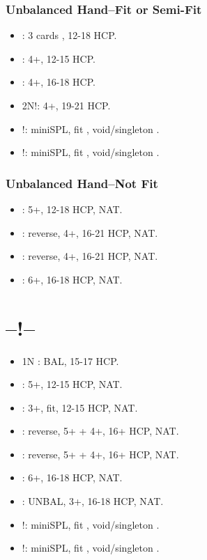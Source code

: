 \documentclass[12pt,twoside,a5paper]{report}%
\begin{document}
		\subsubsection*{Unbalanced Hand--Fit or Semi-Fit}
		\begin{itemize}
		\renewcommand{\labelitemi}{}	
			\item {} : 3 cards \he{}, 12-18 HCP.
			\item {} : 4+\sp{}, 12-15 HCP.
			\item {} : 4+\sp{}, 16-18 HCP.
			\item 2N!: 4+\sp{}, 19-21 HCP.
			\item {}!: miniSPL, fit \sp{}, void/singleton \di{}.
			\item {}!: miniSPL, fit \sp{}, void/singleton \he{}.
		\end{itemize}

		\subsubsection*{Unbalanced Hand--Not Fit}
		\begin{itemize}
		\renewcommand{\labelitemi}{}
			\item {} : 5+\cl{}, 12-18 HCP, NAT.
			\item {} : reverse, 4+\di{}, 16-21 HCP, NAT.
			\item {} : reverse, 4+\he{}, 16-21 HCP, NAT.
			\item {} : 6+\cl{}, 16-18 HCP, NAT.
		\end{itemize}

	\section*{--!--}
	
		\begin{itemize}
		\renewcommand{\labelitemi}{}
			\item 1N : BAL, 15-17 HCP.
			\item {} : 5+\cl{}, 12-15 HCP, NAT.
			\item {} : 3+\di{}, fit, 12-15 HCP, NAT.
			\item {} : reverse, 5+\cl{} + 4+\he{}, 16+ HCP, NAT.
			\item {} : reverse, 5+\cl{} + 4+\sp{}, 16+ HCP, NAT.
			\item {} : 6+\cl{}, 16-18 HCP, NAT.
			\item {} : UNBAL, 3+\di{}, 16-18 HCP, NAT.
			\item {}!: miniSPL, fit \di{}, void/singleton \he{}.
			\item {}!: miniSPL, fit \di{}, void/singleton \sp{}.
		\end{itemize}
\end{document}
